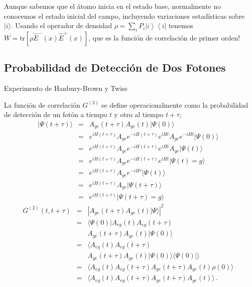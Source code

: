 \documentclass[twocolumn,aps,eqsecnum]{revtex4}
\providecommand{\ket}[1]{\lvert #1 \rangle}
\providecommand{\tr}[1]{\text{tr}\left[ #1 \right]}
\newcommand{\ketbra}[2]{\left| {#1} \right\rangle\left\langle {#2}\right|}
\begin{document}
Aunque sabemos que el \'atomo inicia en el estado base, normalmente 
no conocemos el estado inicial del campo, incluyendo variaciones 
estad\'isticas sobre $\ket{i}$. Usando el operador de densidad 
$\rho = \sum_i P_i \ketbra{i}{i}$ tenemos 
$W= \tr{\rho \hat{E}^- (x)  \hat{E}^+ (x)}$, que es la funci\'on de 
correlaci\'on de primer orden!

\subsection{Probabilidad de Detecci\'on de Dos Fotones} %
Experimento de Hanbury-Brown y Twiss

La funci\'on de correlaci\'on $G^{(2)}$ se define operacionalmente como la 
probabilidad de detecci\'on de un fot\'on a tiempo $t$ y otro al tiempo 
$t+\tau$, 
%
\begin{eqnarray*}  	%
|\Psi(t+\tau) \rangle &=& A_{ge} (t+\tau) A_{ge} (t) |\Psi (0) \rangle  	\\
	&=& e^{iH(t+\tau)} A_{ge} e^{-iH(t+\tau)} e^{iHt} A_{ge} e^{-iHt} 
		|\Psi (0) \rangle \\ 
&=& e^{iH(t+\tau)} A_{ge} e^{-iH(t+\tau)} e^{iHt} A_{ge} |\Psi (t) \rangle \\ 
&=& e^{iH(t+\tau)} A_{ge} e^{-iH(t+\tau)} e^{iHt} |\Psi(t)=g \rangle \\ 
&=& e^{iH(t+\tau)} A_{ge} e^{-iH\tau}  |\Psi(t) \rangle \\ 
&=& e^{iH(t+\tau)} A_{ge} |\Psi(t+\tau) \rangle \\
&=&	e^{iH(t+\tau)} |\Psi(t+\tau)=g \rangle 
\end{eqnarray*} 	
%
\begin{eqnarray*}  	\label{ec:G2operacional}
G^{(2)} (t,t+\tau) &=& \left| A_{ge} (t+\tau) A_{ge} (t) |\Psi \rangle  \right|^2 	
	\nonumber \\ 
&=& \langle \Psi(0) | A_{eg} (t) A_{eg} (t+\tau)  \\ 
	&& A_{ge} (t+\tau) A_{ge} (t) |\Psi(0) \rangle \\
&=& \langle  A_{eg} (t) A_{eg} (t+\tau)  \\ 
	&& A_{ge} (t+\tau) A_{ge} (t) |\Psi(0) \rangle \langle \Psi(0) |  \rangle \\
&=& \langle  A_{eg} (t) A_{eg} (t+\tau)  A_{ge} (t+\tau) A_{ge} (t)\rho(0) \rangle \\
&=& \langle  A_{eg} (t) A_{eg} (t+\tau)  A_{ge} (t+\tau) A_{ge} (t) \rangle \,.
\end{eqnarray*} 	
\end{document}

